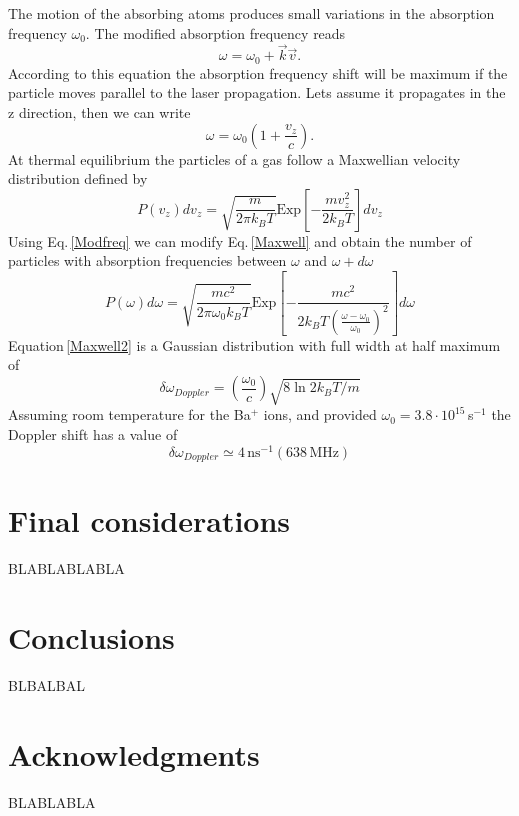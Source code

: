 The motion of the absorbing atoms produces small variations in the absorption frequency $\omega_0$. The modified absorption frequency reads
\begin{equation}
\omega=\omega_0+\vec{k}\vec{v}.
\end{equation}
According to this equation the absorption frequency shift will be maximum if the particle moves parallel to the laser propagation. Lets assume it propagates in the z direction, then we can write
\begin{equation}
\label{Modfreq}
\omega=\omega_0\left(1+\frac{v_z}{c}\right).
\end{equation}
At thermal equilibrium the particles of a gas follow a Maxwellian velocity distribution defined by
\begin{equation}
\label{Maxwell}
P(v_z)dv_z=\sqrt{\frac{m}{2\pi k_B T}}\text{Exp}\left[-\frac{mv_z^2}{2k_BT}\right]dv_z
\end{equation}
Using Eq.\,\ref{Modfreq} we can modify Eq.\,\ref{Maxwell} and obtain the number of particles with absorption frequencies between $\omega$ and $\omega+d\omega$
\begin{equation}
\label{Maxwell2}
P(\omega)d\omega=\sqrt{\frac{mc^2}{2\pi \omega_0 k_B T}}\text{Exp}\left[-\frac{mc^2}{2k_BT\left(\frac{\omega-\omega_0}{\omega_0}\right)^2}\right]d\omega
\end{equation}
Equation\,\ref{Maxwell2} is a Gaussian distribution with full width at half maximum of
\begin{equation}
\delta\omega_{Doppler}=\left(\frac{\omega_0}{c}\right)\sqrt{8\ln2k_BT/m}
\end{equation}
Assuming room temperature for the Ba$^+$ ions, and provided $\omega_0=3.8\cdot10^{15}$\,s$^{-1}$ the Doppler shift has a value of
\begin{equation}
\delta\omega_{Doppler}\simeq4\,\text{ns}^{-1} (638\,\text{MHz})
\end{equation}

\section{Final considerations}
BLABLABLABLA
\section{Conclusions}
BLBALBAL
\section{Acknowledgments}
BLABLABLA



%
%
%
%
%
%
%
%
%

